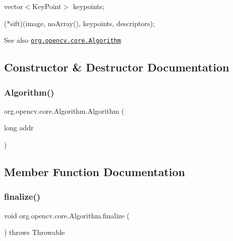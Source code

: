 {\ttfamily }

{\ttfamily vector$<$\+Key\+Point$>$ keypoints;}

{\ttfamily }

{\ttfamily }

{\ttfamily ($\ast$sift)(image, no\+Array(), keypoints, descriptors);}

{\ttfamily }

{\ttfamily \begin{DoxySeeAlso}{See also}
\href{http://docs.opencv.org/modules/core/doc/basic_structures.html#algorithm}{\tt org.\+opencv.\+core.\+Algorithm} 
\end{DoxySeeAlso}
}

\subsection{Constructor \& Destructor Documentation}
\mbox{\label{classorg_1_1opencv_1_1core_1_1_algorithm_ab4aace9fecac25577ba36664213173fe}} 
\subsubsection{\texorpdfstring{Algorithm()}{Algorithm()}}
{\footnotesize\ttfamily org.\+opencv.\+core.\+Algorithm.\+Algorithm (\begin{DoxyParamCaption}\item[{long}]{addr }\end{DoxyParamCaption})\hspace{0.3cm}{\ttfamily [protected]}}



\subsection{Member Function Documentation}
\mbox{\label{classorg_1_1opencv_1_1core_1_1_algorithm_a6100db1faf9f02274e5720036899fd8c}} 
\subsubsection{\texorpdfstring{finalize()}{finalize()}}
{\footnotesize\ttfamily void org.\+opencv.\+core.\+Algorithm.\+finalize (\begin{DoxyParamCaption}{ }\end{DoxyParamCaption}) throws Throwable\hspace{0.3cm}{\ttfamily [protected]}}

